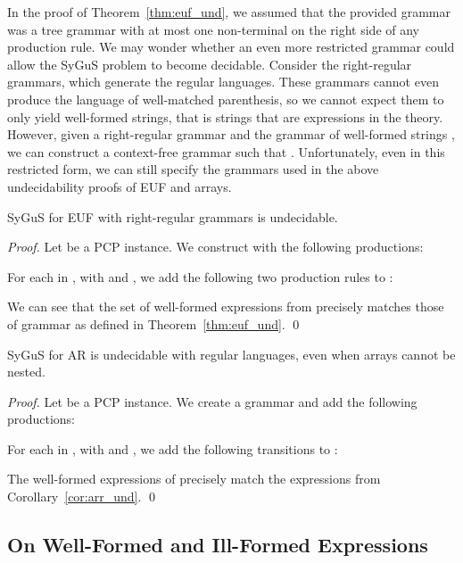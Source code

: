 In the proof of Theorem~\ref{thm:euf_und}, we assumed that the provided grammar was a tree grammar with at most one non-terminal on the right side of any production rule. 
We may wonder whether an even more restricted grammar could allow the SyGuS problem to become decidable. Consider the right-regular grammars, which generate the regular languages. 
These grammars cannot even produce the language of well-matched parenthesis, so we cannot expect them to only yield well-formed strings, that is strings that are expressions in the theory. 
However, given a right-regular grammar  and the grammar of well-formed strings , we can construct a context-free grammar  such that . 
Unfortunately, even in this restricted form, we can still specify the grammars used in the above undecidability proofs of EUF and arrays.

\begin{corollary}
SyGuS for EUF with right-regular grammars is undecidable.
\end{corollary}
\begin{proof}
Let  be a PCP instance. 
We construct  with the following productions:


For each  in , with  and , we add the following two production rules to :




We can see that the set of well-formed expressions from  precisely matches those of grammar  as defined in Theorem~\ref{thm:euf_und}. \qed
\end{proof}




\begin{corollary}
    SyGuS for AR is undecidable with regular languages, even when arrays cannot be nested.
\end{corollary}
\begin{proof}
Let  be a PCP instance. We create a grammar  and add the following productions:


\renewcommand{\read}[0]{\mathit{read}}

For each  in , with  and , we add the following transitions to : 



The well-formed expressions of  precisely match the expressions from Corollary~\ref{cor:arr_und}. 
\qed
\end{proof}




\subsection{On Well-Formed and Ill-Formed Expressions}

